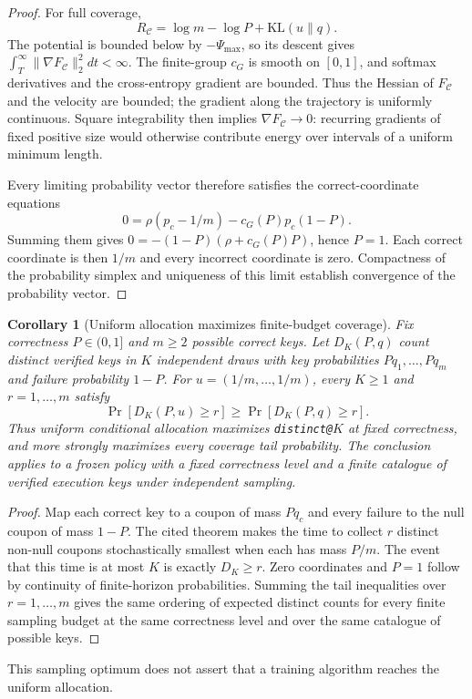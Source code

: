 \documentclass{article}
\newcommand{\enforcehalffinalproseline}{%
  \setlength{\parfillskip}{0pt plus .20\linewidth}}
\newcommand{\1}{\mathbf 1}
\newtheorem{corollary}[lemma]{Corollary}
\theoremstyle{remark}
\theoremstyle{definition}
\theoremstyle{plain}
\begin{document}
\begin{proof}
\enforcehalffinalproseline
For full coverage,
\begin{equation}
 R_{\mathcal C}=\log m-\log P+\mathrm{KL}(u\|q).
 \label{eq:replay-mass-uniformity-decomposition}
\end{equation}
The potential is bounded below by $-\Psi_{\max}$, so its descent gives
$\int_T^\infty\|\nabla F_{\mathcal C}\|_2^2dt<\infty$. The finite-group
$c_G$ is smooth on $[0,1]$, and softmax derivatives and the cross-entropy
gradient are bounded. Thus the Hessian of $F_{\mathcal C}$ and the velocity
are bounded; the gradient along the trajectory is uniformly continuous.
Square integrability then implies $\nabla F_{\mathcal C}\to0$: recurring
gradients of fixed positive size would otherwise contribute energy over
intervals of a uniform minimum length.

Every limiting probability vector therefore satisfies the correct-coordinate
equations
\[
 0=\rho(p_c-1/m)-c_G(P)p_c(1-P).
\]
Summing them gives $0=-(1-P)(\rho+c_G(P)P)$, hence $P=1$. Each correct
coordinate is then $1/m$ and every incorrect coordinate is zero. Compactness
of the probability simplex and uniqueness of this limit establish convergence
of the probability vector.
\end{proof}

\begin{corollary}[Uniform allocation maximizes finite-budget coverage]
\enforcehalffinalproseline
\label{cor:coupon-uniform-coverage}
Fix correctness $P\in(0,1]$ and $m\ge2$ possible correct keys.
Let $D_K(P,q)$ count distinct verified keys in $K$ independent draws with
key probabilities $Pq_1,\ldots,Pq_m$ and failure probability $1-P$.
For $u=(1/m,\ldots,1/m)$, every $K\ge1$ and $r=1,\ldots,m$ satisfy
\begin{equation}
 \Pr[D_K(P,u)\ge r]\ge\Pr[D_K(P,q)\ge r].
 \label{eq:coupon-uniform-coverage}
\end{equation}
Thus uniform conditional allocation maximizes \texttt{distinct@}$K$ at
fixed correctness, and more strongly maximizes every coverage tail
probability. The conclusion applies
\citet[Theorem~3, v1]{anceaume2015coupon} to a frozen policy with a fixed
correctness level and a finite catalogue of verified execution keys under
independent sampling.
\end{corollary}
\begin{proof}
\enforcehalffinalproseline
Map each correct key to a coupon of mass $Pq_c$ and every failure to the
null coupon of mass $1-P$. The cited theorem makes the time to collect $r$
distinct non-null coupons stochastically smallest when each has mass $P/m$.
The event that this time is at most $K$ is exactly $D_K\ge r$.
Zero coordinates and $P=1$ follow by continuity of finite-horizon
probabilities. Summing the tail inequalities over $r=1,\ldots,m$ gives the
same ordering of expected distinct counts for every finite sampling budget
at the same correctness level and over the same catalogue of possible keys.
\end{proof}
This sampling optimum does not assert that a training algorithm reaches the
uniform allocation.
\end{document}

